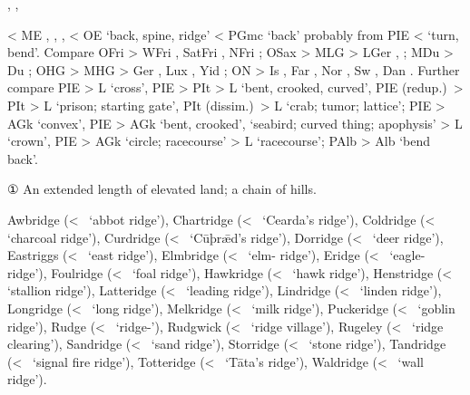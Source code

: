 \documentclass[12pt,letterpaper,oneside,article,draft]{memoir}
\begin{document}
\begin{Lemma}
\begin{Also}
	, , 
\end{Also}
\begin{Etymology}
	< ME , , ,  < OE  ‘back, spine, ridge’
		< PGmc  ‘back’ probably from PIE  <  ‘turn, bend’.
	Compare
	OFri  > WFri , SatFri , NFri ;
	OSax  > MLG  > LGer , ;
	MDu  > Du ;
	OHG  > MHG  > Ger , Lux , Yid  ;
	ON  > Is , Far , Nor , Sw , Dan .
	Further compare
	PIE  > L  ‘cross’,
		PIE  > PIt  > L  ‘bent, crooked, curved’,
		PIE  (redup.)\ > PIt  > L  ‘prison; starting gate’,
			PIt  (dissim.)\ > L  ‘crab; tumor; lattice’;
	PIE  > AGk   ‘convex’,
		PIE  > AGk   ‘bent, crooked’,
			  ‘seabird; curved thing; apophysis’ > L  ‘crown’,
		PIE  > AGk   ‘circle; racecourse’ > L  ‘racecourse’;
	PAlb  > Alb  ‘bend back’.
\end{Etymology}
\begin{Definitions}
	① An extended length of elevated land; a chain of hills.
\end{Definitions}
\begin{Examples}
	Awbridge (<~ ‘abbot ridge’),
	Chartridge (<~ ‘Cearda’s ridge’),
	Coldridge (<~ ‘charcoal ridge’),
	Curdridge (<~ ‘Cūþrǣd’s ridge’),
	Dorridge (<~ ‘deer ridge’),
	Eastriggs (<~ ‘east ridge’),
	Elmbridge (<~ ‘elm- ridge’),
	Eridge (<~ ‘eagle- ridge’),
	Foulridge (<~ ‘foal ridge’),
	Hawkridge (<~ ‘hawk ridge’),
	Henstridge (<~ ‘stallion ridge’),
	Latteridge (<~ ‘leading ridge’),
	Lindridge (<~ ‘linden ridge’),
	Longridge (<~ ‘long ridge’),
	Melkridge (<~ ‘milk ridge’),
	Puckeridge (<~ ‘goblin ridge’),
	Rudge (<~ ‘ridge-’),
	Rudgwick (<~ ‘ridge village’),
	Rugeley (<~ ‘ridge clearing’),
	Sandridge (<~ ‘sand ridge’),
	Storridge (<~ ‘stone ridge’),
	Tandridge (<~ ‘signal fire ridge’),
	Totteridge (<~ ‘Tāta’s ridge’),
	Waldridge (<~ ‘wall ridge’).
\end{Examples}
\end{Lemma}
\end{document}
